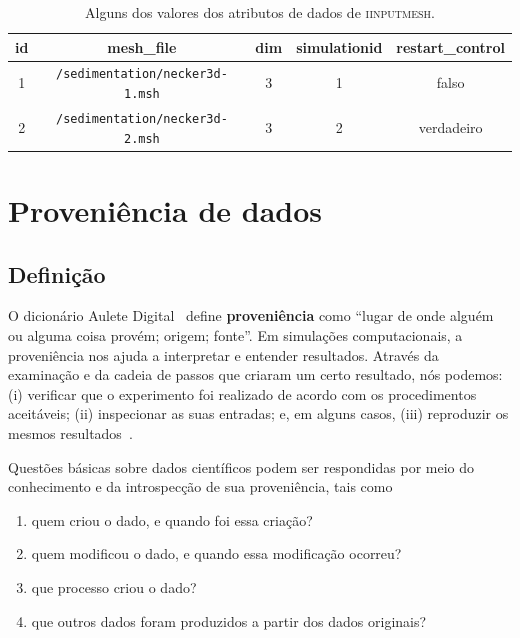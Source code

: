 \begin{table}[htb]
    \centering
    \begin{tabular}{c|c|c|c|c}
        \textbf{id} & \textbf{mesh{\_}file} & \textbf{dim} & \textbf{simulationid} & \textbf{restart{\_}control} \\
        \hline
        1 & \texttt{/sedimentation/necker3d-1.msh} & 3 & 1 & \textrm{falso} \\
        2 & \texttt{/sedimentation/necker3d-2.msh} & 3 & 2 & \textrm{verdadeiro} \\
    \end{tabular}
    \caption[Valores dos atributos de dados de \textsc{iinputmesh}]{Alguns dos valores dos atributos de dados de \textsc{iinputmesh}.}%
    \label{tab:iinputmesh-values}
\end{table}

\section{Proveniência de dados}

\subsection{Definição}

O dicionário Aulete Digital~\cite{aulete2014dicionario} define \textbf{proveniência} como
``lugar de onde alguém ou alguma coisa provém; origem; fonte''. Em simulações computacionais, a proveniência nos ajuda a interpretar e entender resultados. Através da examinação e da cadeia de passos que criaram um certo resultado, nós podemos: (i) verificar que o experimento foi realizado de acordo com os procedimentos aceitáveis; (ii) inspecionar as suas entradas; e, em alguns casos, (iii) reproduzir os mesmos resultados~\cite{freire2008provenance}.

Questões básicas sobre dados científicos podem ser respondidas por meio do conhecimento e da introspecção de sua proveniência, tais como

\begin{enumerate}
    \item quem criou o dado, e quando foi essa criação?
    \item quem modificou o dado, e quando essa modificação ocorreu?
    \item que processo criou o dado?
    \item que outros dados foram produzidos a partir dos dados originais?
\end{enumerate}

